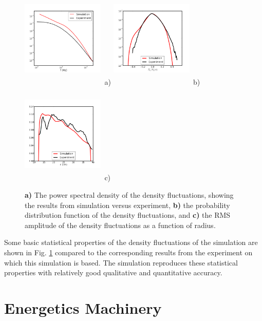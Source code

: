 \documentclass[showpacs,preprintnumbers,amsmath,amssymb,superscriptaddress]{revtex4}
\begin{document}
\begin{figure}
\includegraphics[width=0.35\textwidth,height=48mm]{sim_vs_exp_spec}~a)
\hfil
\includegraphics[width=0.35\textwidth,height=48mm]{pdf}~b)
\hfil
\includegraphics[width=0.35\textwidth,height=48mm]{radial_rms}~c)
\hfil
\caption{\textbf{a)} The power spectral density of the density fluctuations, showing the results from simulation versus experiment, \textbf{b)} the probability distribution function
of the density fluctuations, and \textbf{c)} the RMS amplitude of the density fluctuations as a function of radius.}
\label{validation}
\end{figure}

Some basic statistical properties of the density fluctuations of the simulation are shown in Fig. \ref{validation} compared to the corresponding results from the experiment on which
this simulation is based. The simulation reproduces these statistical properties with relatively good qualitative and quantitative accuracy.

\section{Energetics Machinery}
\label{sec_energetics_machinery}
\end{document}
